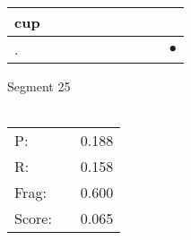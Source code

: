 \documentclass[landscape]{article}
\newcommand{\ssp}{\hspace{2pt}}
\newcommand{\mex}{\cellcolor{g}$\bullet$}
\begin{document}
\begin{tabular}{|l|p{10pt}|p{10pt}|p{10pt}|p{10pt}|p{10pt}|p{10pt}|p{10pt}|p{10pt}|p{10pt}|}
\hline
\ssp cup \ssp&\hspace{2pt}&\hspace{2pt}&\hspace{2pt}&\hspace{2pt}&\hspace{2pt}&\hspace{2pt}&\hspace{2pt}&\hspace{2pt}&\hspace{2pt}\\
\hline
\ssp \cellcolor{ref8}. \ssp&\hspace{2pt}&\hspace{2pt}&\hspace{2pt}&\hspace{2pt}&\hspace{2pt}&\hspace{2pt}&\hspace{2pt}&\hspace{2pt}&\hspace{2pt}\mex\\
\hline
\end{tabular}

\vspace{6pt}
\noindent Segment 25\\\\
\noindent\begin{tabular}{lm{12pt}r}
\hline
P:&&0.188\\
R:&&0.158\\
Frag:&&0.600\\
Score:&&0.065\\
\end{tabular}

\newpage
\end{document}
